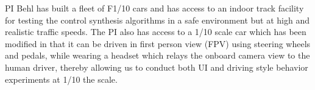 PI Behl has built a fleet of F1/10 cars and has access to an indoor track facility for testing the control synthesis algorithms in a safe environment but at high and realistic traffic speeds. The PI also has access to a 1/10 scale car which has been modified in that it can be driven in first person view (FPV) using steering wheels and pedals, while wearing a headset which relays the onboard camera view to the human driver, thereby allowing us to conduct both UI and driving style behavior experiments at 1/10 the scale.

